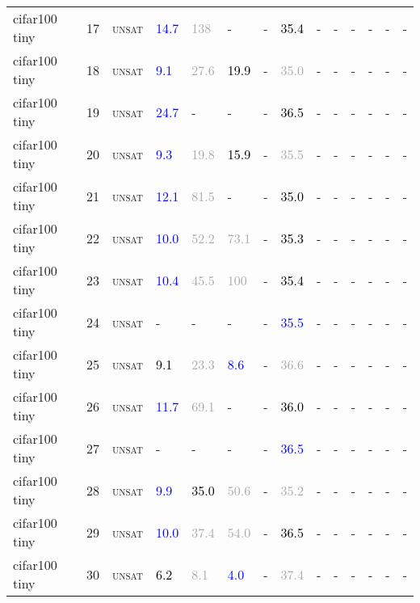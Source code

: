 \begin{center}
{\begin{longtable}{@{}llllllllllllll@{}}
cifar100 tiny & 17 & \textsc{unsat} & \textcolor{blue}{14.7} & \textcolor{darkgray}{138} & - & - & \textcolor{black}{35.4} & - & - & - & - & - & - \\
cifar100 tiny & 18 & \textsc{unsat} & \textcolor{blue}{9.1} & \textcolor{darkgray}{27.6} & \textcolor{black}{19.9} & - & \textcolor{darkgray}{35.0} & - & - & - & - & - & - \\
cifar100 tiny & 19 & \textsc{unsat} & \textcolor{blue}{24.7} & - & - & - & \textcolor{black}{36.5} & - & - & - & - & - & - \\
cifar100 tiny & 20 & \textsc{unsat} & \textcolor{blue}{9.3} & \textcolor{darkgray}{19.8} & \textcolor{black}{15.9} & - & \textcolor{darkgray}{35.5} & - & - & - & - & - & - \\
cifar100 tiny & 21 & \textsc{unsat} & \textcolor{blue}{12.1} & \textcolor{darkgray}{81.5} & - & - & \textcolor{black}{35.0} & - & - & - & - & - & - \\
cifar100 tiny & 22 & \textsc{unsat} & \textcolor{blue}{10.0} & \textcolor{darkgray}{52.2} & \textcolor{darkgray}{73.1} & - & \textcolor{black}{35.3} & - & - & - & - & - & - \\
cifar100 tiny & 23 & \textsc{unsat} & \textcolor{blue}{10.4} & \textcolor{darkgray}{45.5} & \textcolor{darkgray}{100} & - & \textcolor{black}{35.4} & - & - & - & - & - & - \\
cifar100 tiny & 24 & \textsc{unsat} & - & - & - & - & \textcolor{blue}{35.5} & - & - & - & - & - & - \\
cifar100 tiny & 25 & \textsc{unsat} & \textcolor{black}{9.1} & \textcolor{darkgray}{23.3} & \textcolor{blue}{8.6} & - & \textcolor{darkgray}{36.6} & - & - & - & - & - & - \\
cifar100 tiny & 26 & \textsc{unsat} & \textcolor{blue}{11.7} & \textcolor{darkgray}{69.1} & - & - & \textcolor{black}{36.0} & - & - & - & - & - & - \\
cifar100 tiny & 27 & \textsc{unsat} & - & - & - & - & \textcolor{blue}{36.5} & - & - & - & - & - & - \\
cifar100 tiny & 28 & \textsc{unsat} & \textcolor{blue}{9.9} & \textcolor{black}{35.0} & \textcolor{darkgray}{50.6} & - & \textcolor{darkgray}{35.2} & - & - & - & - & - & - \\
cifar100 tiny & 29 & \textsc{unsat} & \textcolor{blue}{10.0} & \textcolor{darkgray}{37.4} & \textcolor{darkgray}{54.0} & - & \textcolor{black}{36.5} & - & - & - & - & - & - \\
cifar100 tiny & 30 & \textsc{unsat} & \textcolor{black}{6.2} & \textcolor{darkgray}{8.1} & \textcolor{blue}{4.0} & - & \textcolor{darkgray}{37.4} & - & - & - & - & - & - \\

\end{longtable}}
\end{center}

